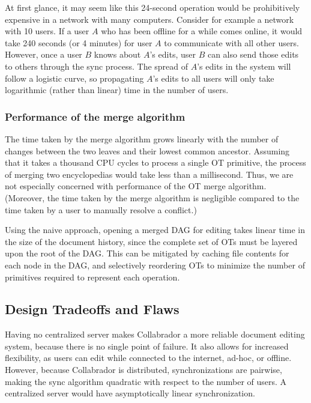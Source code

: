 \documentclass[11pt,titlepage]{article}
\begin{document}
At first glance, it may seem like this 24-second operation
would be prohibitively expensive in a network with many
computers. Consider for example a network with 10 users. If
a user $A$ who has been offline for a while comes online,
it would take 240 seconds (or 4 minutes) for user $A$ to
communicate with all other users. However, once a user $B$
knows about $A$'s edits, user $B$ can also send those edits
to others through the sync process. The spread of $A$'s
edits in the system will follow a logistic curve, so
propagating $A$'s edits to all users will only take
logarithmic (rather than linear) time in the number of
users.

\subsubsection{Performance of the merge algorithm}

The time taken by the merge algorithm grows linearly with the number
of changes between the two leaves and their lowest common ancestor.
Assuming that it takes a thousand CPU cycles to process a single OT
primitive, the process of merging two encyclopedias would take less
than a millisecond.  Thus, we are not especially concerned with
performance of the OT merge algorithm.  (Moreover, the time taken by
the merge algorithm is negligible compared to the time taken by a user
to manually resolve a conflict.)

Using the naive approach, opening a merged DAG for editing takes
linear time in the size of the document history, since the complete
set of OTs must be layered upon the root of the DAG.  This can be
mitigated by caching file contents for each node in the DAG, and
selectively reordering OTs to minimize the number of primitives
required to represent each operation.

\subsection{Design Tradeoffs and Flaws}

Having no centralized server makes Collabrador a more reliable
document editing system, because there is no single point of
failure. It also allows for increased flexibility, as users can edit
while connected to the internet, ad-hoc, or offline. However, because
Collabrador is distributed, synchronizations are pairwise, making the
sync algorithm quadratic with respect to the number of users. A
centralized server would have asymptotically linear synchronization.
\end{document}
